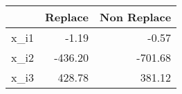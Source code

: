 \begin{tabular}{rrr}
  \hline
 & Replace & Non Replace \\ 
  \hline
x\_i1 & -1.19 & -0.57 \\ 
  x\_i2 & -436.20 & -701.68 \\ 
  x\_i3 & 428.78 & 381.12 \\ 
   \hline
\end{tabular}
